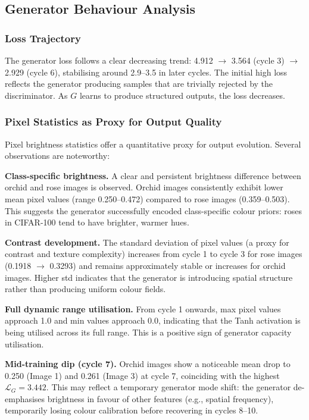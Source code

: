 \documentclass[conference]{IEEEtran}
\begin{document}
\subsection{Generator Behaviour Analysis}
\label{ssec:gen_analysis}

\subsubsection{Loss Trajectory}
The generator loss follows a clear decreasing trend: 4.912 $\to$ 3.564 (cycle 3) $\to$ 2.929 (cycle 6), stabilising around 2.9--3.5 in later cycles. The initial high loss reflects the generator producing samples that are trivially rejected by the discriminator. As $G$ learns to produce structured outputs, the loss decreases.

\subsubsection{Pixel Statistics as Proxy for Output Quality}
Pixel brightness statistics offer a quantitative proxy for output evolution. Several observations are noteworthy:

\textbf{Class-specific brightness.} A clear and persistent brightness difference between orchid and rose images is observed. Orchid images consistently exhibit lower mean pixel values (range 0.250--0.472) compared to rose images (0.359--0.503). This suggests the generator successfully encoded class-specific colour priors: roses in CIFAR-100 tend to have brighter, warmer hues.

\textbf{Contrast development.} The standard deviation of pixel values (a proxy for contrast and texture complexity) increases from cycle 1 to cycle 3 for rose images (0.1918 $\to$ 0.3293) and remains approximately stable or increases for orchid images. Higher std indicates that the generator is introducing spatial structure rather than producing uniform colour fields.

\textbf{Full dynamic range utilisation.} From cycle 1 onwards, max pixel values approach 1.0 and min values approach 0.0, indicating that the Tanh activation is being utilised across its full range. This is a positive sign of generator capacity utilisation.

\textbf{Mid-training dip (cycle 7).} Orchid images show a noticeable mean drop to 0.250 (Image 1) and 0.261 (Image 3) at cycle 7, coinciding with the highest $\mathcal{L}_G = 3.442$. This may reflect a temporary generator mode shift: the generator de-emphasises brightness in favour of other features (e.g., spatial frequency), temporarily losing colour calibration before recovering in cycles 8--10.
\end{document}
